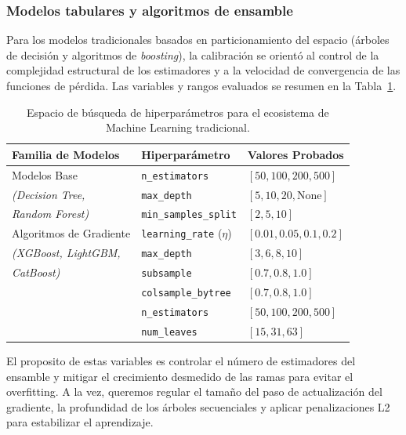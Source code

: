 \documentclass[12pt,a4paper,onecolumn,oneside]{report}
\begin{document}
\subsubsection{Modelos tabulares y algoritmos de ensamble}
Para los modelos tradicionales basados en particionamiento del espacio (árboles de decisión y algoritmos de \textit{boosting}), la calibración se orientó al control de la complejidad estructural de los estimadores y a la velocidad de convergencia de las funciones de pérdida. Las variables y rangos evaluados se resumen en la Tabla~\ref{tab:hiperparametros_ml}.

\begin{table}[htbp]
\centering
\small
\renewcommand{\arraystretch}{1.3}
    \begin{tabular}{lp{3.2cm}p{3.2cm}}
        \hline
        \textbf{Familia de Modelos} & \textbf{Hiperparámetro} & \textbf{Valores Probados} \\ \hline
        Modelos Base & \texttt{n\_estimators} & $[50, 100, 200, 500]$ \\
        \textit{(Decision Tree,} & \texttt{max\_depth} & $[5, 10, 20, \text{None}]$ \\
        \textit{Random Forest)} & \texttt{min\_samples\_split} & $[2, 5, 10]$ \\ \hline
        Algoritmos de Gradiente & \texttt{learning\_rate} ($\eta$) & $[0.01, 0.05, 0.1, 0.2]$  \\
        \textit{(XGBoost, LightGBM,} & \texttt{max\_depth} & $[3, 6, 8, 10]$  \\
        \textit{CatBoost)} & \texttt{subsample} & $[0.7, 0.8, 1.0]$ \\
        & \texttt{colsample\_bytree} & $[0.7, 0.8, 1.0]$ \\ 
        & \texttt{n\_estimators} & $[50, 100, 200, 500]$ \\ 
        & \texttt{num\_leaves} & $[15, 31, 63]$ \\ \hline
    \end{tabular}
    \caption{Espacio de búsqueda de hiperparámetros para el ecosistema de Machine Learning tradicional.}
    \label{tab:hiperparametros_ml}
\end{table}

El proposito de estas variables es controlar el número de estimadores del ensamble y mitigar el crecimiento desmedido de las ramas para evitar el overfitting. A la vez, queremos regular el tamaño del paso de actualización del gradiente, la profundidad de los árboles secuenciales y aplicar penalizaciones L2 para estabilizar el aprendizaje.
\end{document}
